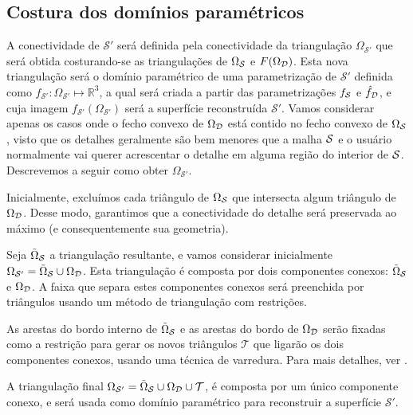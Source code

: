 \subsection{Costura dos domínios paramétricos}
A conectividade de $\mathcal{S}'$ será definida pela conectividade da triangulação $\Omega_{\mathcal{S}'}$ que será obtida costurando-se as triangulações de $\Omega_{\mathcal{S}}$ e $F(\Omega_{\mathcal{D}})$. Esta nova triangulação será o domínio paramétrico de uma parametrização de $\mathcal{S}'$ definida como $f_{\mathcal{S}'} \colon \Omega_{\mathcal{S}'} \mapsto \mathbb{R}^3$, a qual será criada a partir das parametrizações $f_{\mathcal{S}}$ e $\hat{f}_{\mathcal{D}}$, e cuja imagem $f_{\mathcal{S}'}(\Omega_{\mathcal{S}'})$ será a superfície reconstruída $\mathcal{S}'$. Vamos considerar apenas os casos onde o fecho convexo de $\Omega_{\mathcal{D}}$ está contido no fecho convexo de $\Omega_{\mathcal{S}}$, visto que os detalhes geralmente são bem menores que a malha $\mathcal{S}$ e o usuário normalmente vai querer acrescentar o detalhe em alguma região do interior de $\mathcal{S}$. Descrevemos a seguir como obter $\Omega_{\mathcal{S}'}$.

Inicialmente, excluímos cada triângulo de $\Omega_{\mathcal{S}}$ que intersecta algum triângulo de $\Omega_{\mathcal{D}}$. Desse modo, garantimos que a conectividade do detalhe será preservada ao máximo (e consequentemente sua geometria). 

Seja $\tilde{\Omega}_{\mathcal{S}}$ a triangulação resultante, e vamos considerar inicialmente $\Omega_{\mathcal{S}'} = \tilde{\Omega}_{\mathcal{S}} \cup \Omega_{\mathcal{D}}$. Esta triangulação é composta por dois componentes conexos: $\tilde{\Omega}_{\mathcal{S}}$ e $\Omega_{\mathcal{D}}$. A faixa que separa estes componentes conexos será preenchida por triângulos usando um método de triangulação com restrições. 

As arestas do bordo interno de $\tilde{\Omega}_{\mathcal{S}}$ e as arestas do bordo de $\Omega_{\mathcal{D}}$ serão fixadas como a restrição para gerar os novos triângulos $\mathcal{T}$ que ligarão os dois componentes conexos, usando uma técnica de varredura. Para mais detalhes, ver \cite{luizhenrique}.

A triangulação final $\Omega_{\mathcal{S}'} = \tilde{\Omega}_{\mathcal{S}} \cup \Omega_{\mathcal{D}} \cup \mathcal{T}$, é composta por um único componente conexo, e será usada como domínio paramétrico para reconstruir a superfície $\mathcal{S}'$.



